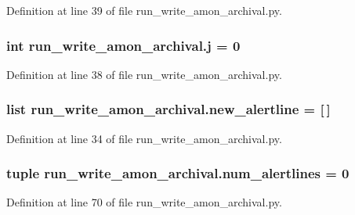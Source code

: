 Definition at line 39 of file run\-\_\-write\-\_\-amon\-\_\-archival.\-py.

\hypertarget{namespacerun__write__amon__archival_a44af312e140e5778b40eff6eceb88a1d}{
\subsubsection[{j}]{\setlength{\rightskip}{0pt plus 5cm}int run\-\_\-write\-\_\-amon\-\_\-archival.\-j = 0}}\label{namespacerun__write__amon__archival_a44af312e140e5778b40eff6eceb88a1d}


Definition at line 38 of file run\-\_\-write\-\_\-amon\-\_\-archival.\-py.

\hypertarget{namespacerun__write__amon__archival_a55e4dda164db25cc5b20d14aef67c4bf}{
\subsubsection[{new\-\_\-alertline}]{\setlength{\rightskip}{0pt plus 5cm}list run\-\_\-write\-\_\-amon\-\_\-archival.\-new\-\_\-alertline = \mbox{[}$\,$\mbox{]}}}\label{namespacerun__write__amon__archival_a55e4dda164db25cc5b20d14aef67c4bf}


Definition at line 34 of file run\-\_\-write\-\_\-amon\-\_\-archival.\-py.

\hypertarget{namespacerun__write__amon__archival_a7e253ecbcbf322bb69121f129cefb3ff}{
\subsubsection[{num\-\_\-alertlines}]{\setlength{\rightskip}{0pt plus 5cm}tuple run\-\_\-write\-\_\-amon\-\_\-archival.\-num\-\_\-alertlines = 0}}\label{namespacerun__write__amon__archival_a7e253ecbcbf322bb69121f129cefb3ff}


Definition at line 70 of file run\-\_\-write\-\_\-amon\-\_\-archival.\-py.

